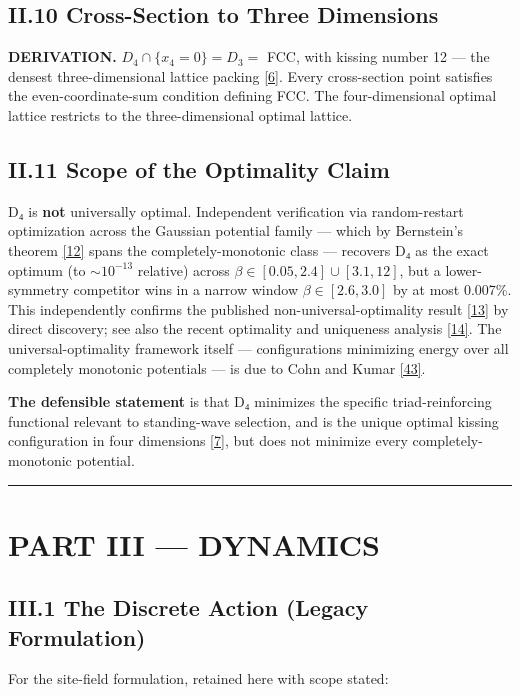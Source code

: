 \documentclass[a4paper,11pt]{article}
\begin{document}
\subsection*{II.10 Cross-Section to Three Dimensions}

\textbf{DERIVATION.} $D_4\cap\{x_4=0\}=D_3=$ FCC, with kissing number 12 — the densest three-dimensional lattice packing \hyperref[ref6]{[6]}. Every cross-section point satisfies the even-coordinate-sum condition defining FCC. The four-dimensional optimal lattice restricts to the three-dimensional optimal lattice.

\subsection*{II.11 Scope of the Optimality Claim}

D₄ is \textbf{not} universally optimal. Independent verification via random-restart optimization across the Gaussian potential family — which by Bernstein's theorem \hyperref[ref12]{[12]} spans the completely-monotonic class — recovers D₄ as the exact optimum (to $\sim10^{-13}$ relative) across $\beta\in[0.05,2.4]\cup[3.1,12]$, but a lower-symmetry competitor wins in a narrow window $\beta\in[2.6,3.0]$ by at most 0.007\%. This independently confirms the published non-universal-optimality result \hyperref[ref13]{[13]} by direct discovery; see also the recent optimality and uniqueness analysis \hyperref[ref14]{[14]}. The universal-optimality framework itself — configurations minimizing energy over all completely monotonic potentials — is due to Cohn and Kumar \hyperref[ref43]{[43]}.

\textbf{The defensible statement} is that D₄ minimizes the specific triad-reinforcing functional relevant to standing-wave selection, and is the unique optimal kissing configuration in four dimensions \hyperref[ref7]{[7]}, but does not minimize every completely-monotonic potential.

\medskip\hrule\medskip

\section*{PART III — DYNAMICS}

\subsection*{III.1 The Discrete Action (Legacy Formulation)}

For the site-field formulation, retained here with scope stated:
\end{document}
